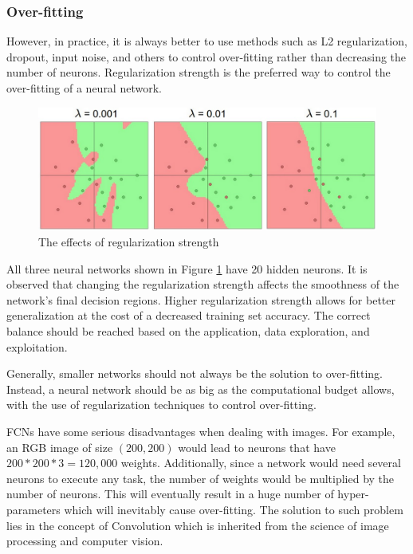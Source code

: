 \subsubsection{Over-fitting}
However, in practice, it is always better to use methods such as L2 regularization, dropout, input noise, and others to control over-fitting rather than decreasing the number of neurons. Regularization strength is the preferred way to control the over-fitting of a neural network.

\begin{figure}[ht!]
\includegraphics[trim={0cm 0cm 0cm 0cm},clip,width=\linewidth]{Figures/reg_strengths.jpeg}
\centering
\caption{The effects of regularization strength}
\label{reg_strength}
\end{figure}

All three neural networks shown in Figure \ref{reg_strength} have 20 hidden neurons. It is observed that changing the regularization strength affects the smoothness of the network's final decision regions. Higher regularization strength allows for better generalization at the cost of a decreased training set accuracy. The correct balance should be reached based on the application, data exploration, and exploitation.

Generally, smaller networks should not always be the solution to over-fitting. Instead, a neural network should be as big as the computational budget allows, with the use of regularization techniques to control over-fitting.

FCNs have some serious disadvantages when dealing with images. For example, an RGB image of size \((200,200)\) would lead to neurons that have \(200*200*3 = 120,000\) weights. Additionally, since a network would need several neurons to execute any task, the number of weights would be multiplied by the number of neurons. This will eventually result in a huge number of hyper-parameters which will inevitably cause over-fitting. The solution to such problem lies in the concept of Convolution which is inherited from the science of image processing and computer vision.

